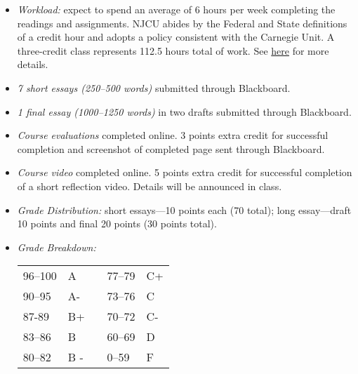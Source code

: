 \documentclass[article,oneside]{memoir}
\begin{document}
\begin{itemize}
\item \textit{Workload:} expect to spend an average of 6 hours per week completing the readings and assignments. NJCU abides by the Federal and State definitions of a credit hour and adopts a policy consistent with the Carnegie Unit. A three-credit class represents 112.5 hours total of work. See \href{http://scottoconnor.org/resources/Credit.pdf}{here} for more details.


\item \textit{7 short essays (250--500 words)} submitted through Blackboard. 

\item \textit{1 final essay (1000--1250 words)} in two drafts submitted through Blackboard. 


\item \textit{Course evaluations} completed online. 3 points extra credit for successful completion and screenshot of completed page sent through Blackboard. 

\item \textit{Course video} completed online. 5 points extra credit for successful completion of a short reflection video. Details will be announced in class.  

\item \textit{Grade Distribution:} short essays---10 points each (70 total); long essay---draft 10 points and final 20 points (30 points total). 

\item \textit{Grade Breakdown:}

 \begin{tabular}{ | l | l | p{2cm} | l | l | }
    \hline 
96--100 & A  & &  77--79 &  C+ \\  
90--95 & A- & &  73--76 & C \\
87-89 & B+ &  &  70--72 & C- \\ 
83--86 & B  & &  60--69 & D\\
80--82 & B - & & 0--59 & F\\ \hline
    \end{tabular}


\end{itemize}
\end{document}
